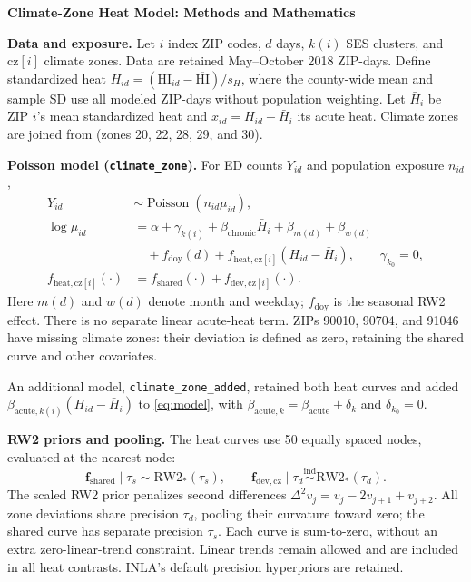 \documentclass[10pt]{article}
\begin{document}
\begin{center}\large\bfseries Climate-Zone Heat Model: Methods and Mathematics\end{center}

\textbf{Data and exposure.}
Let $i$ index ZIP codes, $d$ days, $k(i)$ SES clusters, and $\mathrm{cz}[i]$ climate
zones. Data are retained May--October 2018 ZIP-days. Define standardized heat
$H_{id}=(\mathrm{HI}_{id}-\overline{\mathrm{HI}})/s_H$, where the county-wide
mean and sample SD use all modeled ZIP-days without population weighting.
Let $\bar H_i$ be ZIP $i$'s mean standardized heat and
$x_{id}=H_{id}-\bar H_i$ its acute heat. Climate zones are joined from
 (zones 20, 22, 28, 29, and 30).

\textbf{Poisson model (\texttt{climate\_zone}).}
For ED counts $Y_{id}$ and population exposure $n_{id}$,
\begin{align}
 Y_{id}&\sim\operatorname{Poisson}(n_{id}\mu_{id}),\\
 \log\mu_{id}&=\alpha+\gamma_{k(i)}+\beta_{\mathrm{chronic}}\bar H_i
       +\beta_{m(d)}+\beta_{w(d)}\nonumber\\
 &\quad+f_{\mathrm{doy}}(d)+f_{\mathrm{heat},\mathrm{cz}[i]}(H_{id}-\bar H_i),\qquad \gamma_{k_0}=0,\label{eq:model}\\
 f_{\mathrm{heat},\mathrm{cz}[i]}(\cdot)&=f_{\mathrm{shared}}(\cdot)+f_{\mathrm{dev},\mathrm{cz}[i]}(\cdot).
\end{align}
Here $m(d)$ and $w(d)$ denote month and weekday; $f_{\mathrm{doy}}$ is the
seasonal RW2 effect. There is no separate linear acute-heat term.
ZIPs 90010, 90704, and 91046 have missing climate zones: their deviation
is defined as zero, retaining the shared curve and other covariates.

An additional model, \texttt{climate\_zone\_added}, retained both heat curves
and added $\beta_{\mathrm{acute},k(i)}(H_{id}-\bar H_i)$ to \eqref{eq:model}, with
$\beta_{\mathrm{acute},k}=\beta_{\mathrm{acute}}+\delta_k$ and $\delta_{k_0}=0$.

\textbf{RW2 priors and pooling.}
The heat curves use 50 equally spaced nodes, evaluated at the nearest node:
\[
 \boldsymbol f_{\mathrm{shared}}\mid\tau_s\sim\mathrm{RW2}_*(\tau_s),\qquad
 \boldsymbol f_{\mathrm{dev},\mathrm{cz}}\mid\tau_d
 \overset{\mathrm{ind}}{\sim}\mathrm{RW2}_*(\tau_d).
\]
The scaled RW2 prior penalizes second differences
$\Delta^2v_j=v_j-2v_{j+1}+v_{j+2}$.
All zone deviations share precision $\tau_d$, pooling their curvature toward
zero; the shared curve has separate precision $\tau_s$.
Each curve is sum-to-zero, without an extra zero-linear-trend constraint.
Linear trends remain allowed and are included in all heat contrasts.
INLA's default precision hyperpriors are retained.
\end{document}
